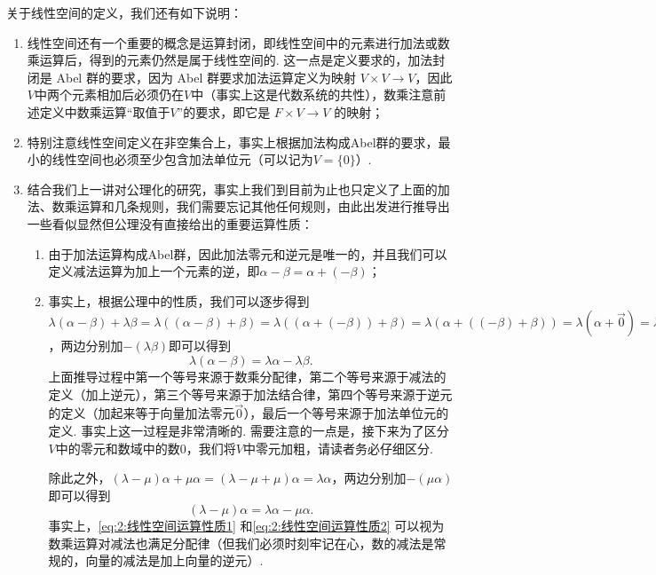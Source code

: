 关于线性空间的定义，我们还有如下说明：
\begin{enumerate}
    \item 线性空间还有一个重要的概念是运算封闭，即线性空间中的元素进行加法或数乘运算后，得到的元素仍然是属于线性空间的. 这一点是定义要求的，加法封闭是 Abel 群的要求，因为 Abel 群要求加法运算定义为映射 $V\times V\to V$，因此$V$中两个元素相加后必须仍在$V$中（事实上这是代数系统的共性），数乘注意前述定义中数乘运算``取值于$V$''的要求，即它是 $F\times V\to V$ 的映射；

    \item 特别注意线性空间定义在非空集合上，事实上根据加法构成Abel群的要求，最小的线性空间也必须至少包含加法单位元（可以记为$V=\{0\}$）.

    \item 结合我们上一讲对公理化的研究，事实上我们到目前为止也只定义了上面的加法、数乘运算和几条规则，我们需要忘记其他任何规则，由此出发进行推导出一些看似显然但公理没有直接给出的重要运算性质：
          \begin{enumerate}
              \item 由于加法运算构成Abel群，因此加法零元和逆元是唯一的，并且我们可以定义减法运算为加上一个元素的逆，即$\alpha-\beta=\alpha+(-\beta)$；

              \item 事实上，根据公理中的性质，我们可以逐步得到$\lambda(\alpha-\beta)+\lambda\beta=\lambda((\alpha-\beta)+\beta)=\lambda((\alpha+(-\beta))+\beta)=\lambda(\alpha+((-\beta)+\beta))=\lambda(\alpha+\vec{0})=\lambda\alpha$，两边分别加$-(\lambda\beta)$即可以得到
                    \begin{equation}\label{eq:2:线性空间运算性质1}
                        \lambda(\alpha-\beta)=\lambda\alpha-\lambda\beta.
                    \end{equation}
                    上面推导过程中第一个等号来源于数乘分配律，第二个等号来源于减法的定义（加上逆元），第三个等号来源于加法结合律，第四个等号来源于逆元的定义（加起来等于向量加法零元$\vec{0}$），最后一个等号来源于加法单位元的定义. 事实上这一过程是非常清晰的. 需要注意的一点是，接下来为了区分$V$中的零元和数域中的数0，我们将$V$中零元加粗，请读者务必仔细区分.

                    除此之外，$(\lambda-\mu)\alpha+\mu\alpha=(\lambda-\mu+\mu)\alpha=\lambda\alpha$，两边分别加$-(\mu\alpha)$即可以得到
                    \begin{equation}\label{eq:2:线性空间运算性质2}
                        (\lambda-\mu)\alpha=\lambda\alpha-\mu\alpha.
                    \end{equation}
                    事实上，\autoref{eq:2:线性空间运算性质1} 和\autoref{eq:2:线性空间运算性质2} 可以视为数乘运算对减法也满足分配律（但我们必须时刻牢记在心，数的减法是常规的，向量的减法是加上向量的逆元）.


\end{enumerate}
\end{enumerate}
